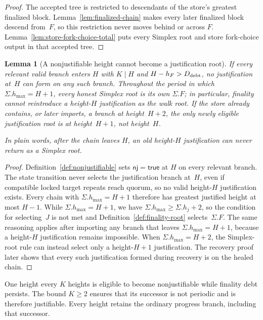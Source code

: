 \ifx\litemode\undefined\documentclass{article}\fi
\theoremstyle{plain}
\newtheorem{lemma}{Lemma}
\theoremstyle{definition}
\theoremstyle{remark}
\newcommand{\nj}{\mathsf{nj}}
\begin{document}
\begin{proof}
The accepted tree is restricted to descendants of the store's greatest
finalized block.  Lemma~\ref{lem:finalized-chain} makes every later finalized
block descend from~\(F\), so this restriction never moves behind or across
\(F\).  Lemma~\ref{lem:store-fork-choice-total} puts every Simplex root and
store fork-choice output in that accepted tree.
\end{proof}

\begin{lemma}[A nonjustifiable height cannot become a justification root]\label{lem:nonjustifiable-fg}
If every relevant valid branch enters \(H\) with
\(K\mid H\) and \(H-h_F>D_{\rm debt}\), no justification at~\(H\) can form
on any such branch.
Throughout the
period in which \(\Sigma.h_{\max}=H+1\), every honest
Simplex root is its own \(\Sigma.F\); in particular, finality cannot reintroduce a
height-\(H\) justification as the walk root.  If the store already contains,
or later imports, a branch at height~\(H+2\), the only newly eligible
justification root is at height~\(H+1\), not height~\(H\).

In plain words, after the chain leaves \(H\), an old height-\(H\)
justification can never return as a Simplex root.
\end{lemma}

\begin{proof}
Definition~\ref{def:nonjustifiable} sets \(\nj=\mathsf{true}\) at \(H\) on
every relevant branch.  The state transition never selects the justification branch at~\(H\), even if
compatible locked target repeats reach quorum, so no valid height-\(H\)
justification exists.
Every chain with \(\Sigma.h_{\max}=H+1\) therefore has greatest justified height
at most \(H-1\).  While \(\Sigma.h_{\max}=H+1\), we have
\(\Sigma.h_{\max}\geq\Sigma.h_j+2\), so the condition for selecting~\(J\) is
not met and Definition~\ref{def:finality-root} selects~\(\Sigma.F\).  The same
reasoning applies after importing any branch that leaves
\(\Sigma.h_{\max}=H+1\), because a height-\(H\) justification remains
impossible.  When \(\Sigma.h_{\max}=H+2\), the Simplex-root rule can instead
select only a height-\(H+1\) justification.  The recovery proof later shows
that every such justification formed during recovery is on the healed chain.
\end{proof}

One height every \(K\) heights is eligible to become nonjustifiable while
finality debt persists.  The bound \(K\geq2\) ensures that its successor is
not periodic and is therefore justifiable.  Every height retains the ordinary
progress branch, including that successor.


\end{document}
